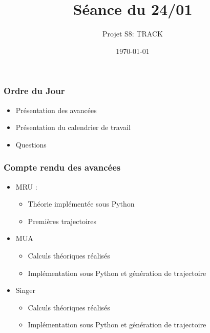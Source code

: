 \documentclass{beamer}
\title{Séance du 24/01}
\author{Projet S8: TRACK}
\institute[T2, Enseirb-Matmeca]{Département Télécommunication\\Enseirb-Matmeca, Bordeaux}
\date{\today}
\begin{document}
\begin{frame}
  \titlepage
\end{frame}

\begin{frame}
  \frametitle{Ordre du Jour}
  \begin{itemize}
    \item Présentation des avancées
    \item Présentation du calendrier de travail
    \item Questions 
  \end{itemize}
\end{frame}

\begin{frame}
  \frametitle{Compte rendu des avancées}
  \begin{itemize}
    \item MRU :
    \begin{itemize}
        \item[\hspace{1cm}] Théorie implémentée sous Python
        \item[\hspace{1cm}] Premières trajectoires 
    \end{itemize}
    \item MUA
    \begin{itemize}
        \item[\hspace{1cm}] Calculs théoriques réalisés
        \item[\hspace{1cm}] Implémentation sous Python et génération de trajectoire
    \end{itemize}
    \item Singer
    \begin{itemize}
        \item[\hspace{1cm}] Calculs théoriques réalisés
        \item[\hspace{1cm}] Implémentation sous Python et génération de trajectoire
    \end{itemize}
  \end{itemize}
\end{frame}
\end{document}
